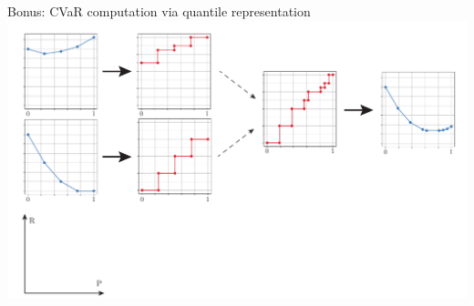 \documentclass{beamer}
\begin{document}

\begin{frame}{Bonus: CVaR computation via quantile representation}
\center
\includegraphics[width=\linewidth]{gfx/cvar_vi_conversion.pdf}
\end{frame}



%
%
%
%
%
%
%


%

\end{document}
